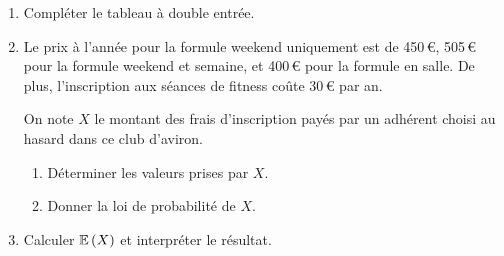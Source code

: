 \documentclass[a4paper,11pt]{article}
\begin{document}
\begin{enumerate}
	\item Compléter le tableau à double entrée.
	\item Le prix à l’année pour la formule weekend uniquement est de 450\,€, 505\,€ pour la formule weekend et semaine, et 400\,€ pour la formule en salle. De plus, l’inscription aux séances de fitness coûte 30\,€ par an. 
	
	On note $X$ le montant des frais d’inscription payés par un adhérent choisi au hasard dans ce club d’aviron. 
	\begin{enumerate}
		\item Déterminer les valeurs prises par $X$.
		\item Donner la loi de probabilité de $X$.
	\end{enumerate}
	\item Calculer $\mathbb{E}\left({X}\right)$ et interpréter le résultat.
\end{enumerate}

\bigskip


\medskip
\end{document}
